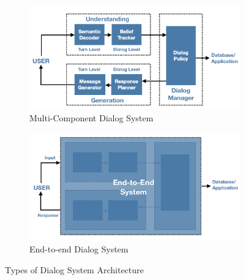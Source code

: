 \begin{figure}
\centering
\begin{subfigure}{\textwidth}
  \includegraphics[width=\linewidth]{assets/figures/dialog_system.png}
  \caption{Multi-Component Dialog System}\label{fig:systemfull}
\end{subfigure}

\vspace*{0.5in}

\begin{subfigure}{\textwidth}
  \includegraphics[width=\linewidth]{assets/figures/end2end.png}
  \caption{End-to-end Dialog System}\label{fig:end2end}
\end{subfigure}
\caption{Types of Dialog System Architecture}
\end{figure}

